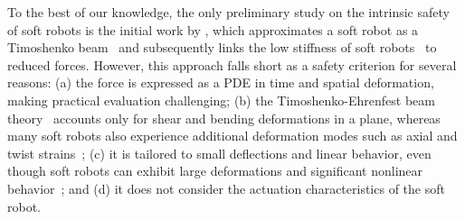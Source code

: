To the best of our knowledge, the only preliminary study on the intrinsic safety of soft robots is the initial work by \citet{abidi2017intrinsic}, which approximates a soft robot as a Timoshenko beam~\citep{timoshenko1921lxvi} and subsequently links the low stiffness of soft robots~\citep{rus2015design} to reduced forces. However, this approach falls short as a safety criterion for several reasons: (a) the force is expressed as a \gls{PDE} in time and spatial deformation, making practical evaluation challenging; (b) the Timoshenko-Ehrenfest beam theory~\citep{timoshenko1921lxvi} accounts only for shear and bending deformations in a plane, whereas many soft robots also experience additional deformation modes such as axial and twist strains~\citep{armanini2023soft}; (c) it is tailored to small deflections and linear behavior, even though soft robots can exhibit large deformations and significant nonlinear behavior~\citep{della2023model}; and (d) it does not consider the actuation characteristics of the soft robot.


